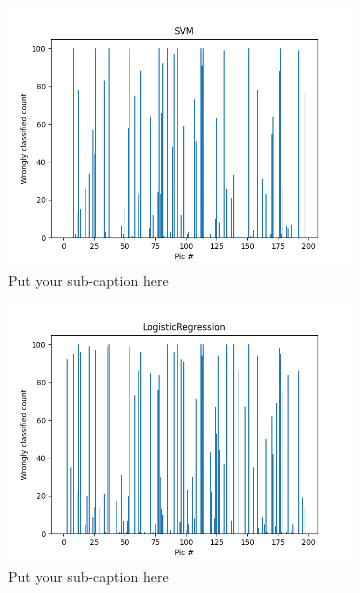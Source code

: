 \documentclass{article}
\begin{document}
\begin{figure}[ht]
\begin{subfigure}{.33\textwidth}
  \centering
  \includegraphics[width=1\linewidth]{1a/SVM.png}  
  \caption{Put your sub-caption here}
  \label{fig:sub-first}
\end{subfigure}
\begin{subfigure}{.33\textwidth}
  \centering
  \includegraphics[width=1\linewidth]{1a/Logistic regression.png}  
  \caption{Put your sub-caption here}
  \label{fig:sub-second}
\end{subfigure}
\begin{subfigure}{.33\textwidth}
  \centering

\end{subfigure}
\end{figure}
\end{document}
